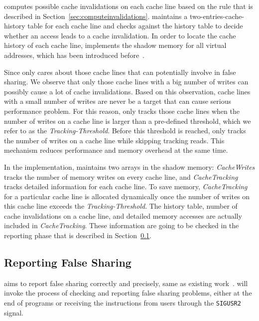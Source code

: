 \Cheetah{} computes possible cache invalidations on each cache line based on the rule that is described in Section~\ref{sec:computeinvalidations}. \Cheetah{} maintains a two-entries-cache-history table for each cache line and checks against the history table to decide whether an access leads to a cache invalidation. In order to locate the cache history of each cache line, \Cheetah{} implements the shadow memory for all virtual addresses, which has been introduced before~\cite{qinzhao}. 

Since \cheetah{} only cares about those cache lines that can potentially involve in false sharing. We observe that only those cache lines with a big number of writes can possibly cause a lot of cache invalidations. Based on this observation, cache lines with a small number of writes are never be a target that can cause serious performance problem. For this reason, \Cheetah{} only tracks those cache lines when the number of writes on a cache line is larger than a pre-defined threshold, which we refer to as the {\it Tracking-Threshold}. Before this threshold is reached, \Cheetah{} only tracks the number of writes on a cache line while skipping tracking reads. This mechanism reduces performance and memory overhead at the same time.

In the implementation, \Cheetah{} maintains two arrays in the shadow memory: {\it CacheWrites} tracks the number of memory writes on every cache line, and {\it CacheTracking} tracks detailed information for each cache line. To save memory, {\it CacheTracking} for a particular cache line is allocated dynamically once the number of writes on this cache line exceeds the {\it Tracking-Threshold}. The history table, number of cache invalidations on a cache line, and detailed memory accesses are actually included in {\it CacheTracking}. These information are going to be checked in the reporting phase that is described in Section~\ref{sec:report}.
 
 \subsection{Reporting False Sharing}
\label{sec:report}

\Cheetah{} aims to report false sharing correctly and precisely, same as existing work~\cite{sheriff, Predator}. \Cheetah{} will invoke the process of checking and reporting false sharing problems, either at the end of programs or receiving the instructions from users through the \texttt{SIGUSR2} signal.  

